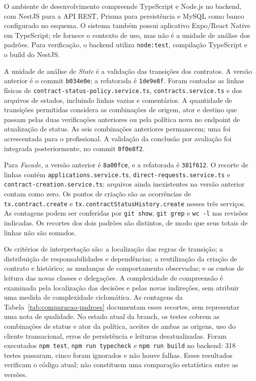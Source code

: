 \documentclass[12pt]{article}
\begin{document}
O ambiente de desenvolvimento compreende TypeScript e Node.js no backend, com NestJS para a API REST, Prisma para persistência e MySQL como banco configurado no esquema. O sistema também possui aplicativo Expo/React Native em TypeScript; ele fornece o contexto de uso, mas não é a unidade de análise dos padrões. Para verificação, o backend utiliza \texttt{node:test}, compilação TypeScript e o build do NestJS.

A unidade de análise de \emph{State} é a validação das transições dos contratos. A versão anterior é o commit \texttt{b034e0e}; a refatorada é \texttt{1de9e8f}. Foram contadas as linhas físicas de \texttt{contract-status-policy.service.ts}, \texttt{contracts.service.ts} e dos arquivos de estados, incluindo linhas vazias e comentários. A quantidade de transições permitidas considera as combinações de origem, ator e destino que passam pelas duas verificações anteriores ou pela política nova no endpoint de atualização de status. As seis combinações anteriores permanecem; uma foi acrescentada para o profissional. A validação da conclusão por avaliação foi integrada posteriormente, no commit \texttt{0f0e8f2}.

Para \emph{Facade}, a versão anterior é \texttt{8a00fce}, e a refatorada é \texttt{381f612}. O recorte de linhas contém \texttt{applications.service.ts}, \texttt{direct-requests.service.ts} e \texttt{contract-creation.service.ts}; arquivos ainda inexistentes na versão anterior contam como zero. Os pontos de criação são as ocorrências de \texttt{tx.contract.create} e \texttt{tx.contractStatusHistory.create} nesses três serviços. As contagens podem ser conferidas por \texttt{git show}, \texttt{git grep} e \texttt{wc -l} nas revisões indicadas. Os recortes dos dois padrões são distintos, de modo que seus totais de linhas não são somados.

Os critérios de interpretação são: a localização das regras de transição; a distribuição de responsabilidades e dependências; a reutilização da criação de contrato e histórico; as mudanças de comportamento observadas; e os custos de leitura das novas classes e delegações. A complexidade de compreensão é examinada pela localização das decisões e pelas novas indireções, sem atribuir uma medida de complexidade ciclomática. As contagens da Tabela~\ref{tab:comparacao-padroes} documentam esses recortes, sem representar uma nota de qualidade. No estado atual da branch, os testes cobrem as combinações de status e ator da política, aceites de ambas as origens, uso do cliente transacional, erros de persistência e leituras desatualizadas. Foram executados \texttt{npm test}, \texttt{npm run typecheck} e \texttt{npm run build} no backend: 318 testes passaram, cinco foram ignorados e não houve falhas. Esses resultados verificam o código atual; não constituem uma comparação estatística entre as versões.
\end{document}
